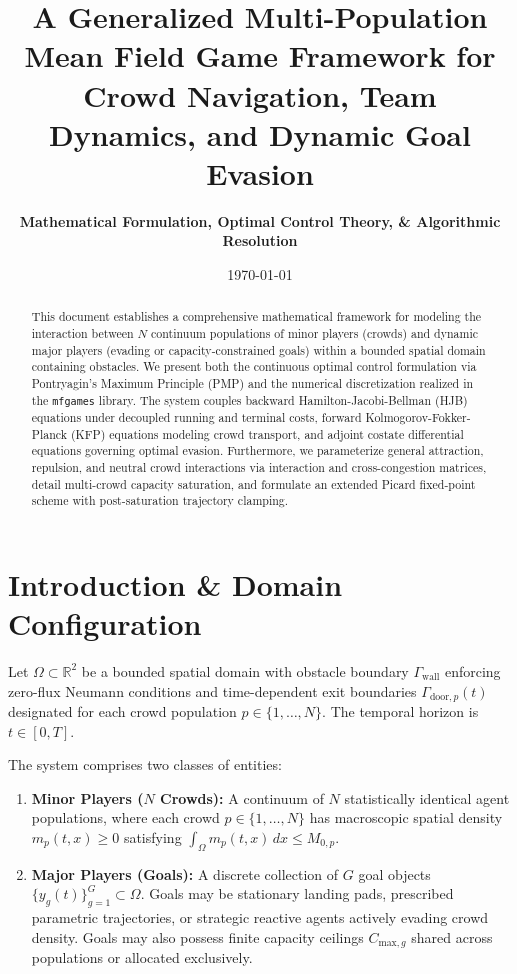\documentclass[11pt,a4paper]{article}
\title{\textbf{A Generalized Multi-Population Mean Field Game Framework for Crowd Navigation, Team Dynamics, and Dynamic Goal Evasion}}
\author{\textbf{Mathematical Formulation, Optimal Control Theory, \& Algorithmic Resolution}}
\date{\today}
\begin{document}
\maketitle

\begin{abstract}
This document establishes a comprehensive mathematical framework for modeling the interaction between $N$ continuum populations of minor players (crowds) and dynamic major players (evading or capacity-constrained goals) within a bounded spatial domain containing obstacles. We present both the continuous optimal control formulation via Pontryagin's Maximum Principle (PMP) and the numerical discretization realized in the \texttt{mfgames} library. The system couples backward Hamilton-Jacobi-Bellman (HJB) equations under decoupled running and terminal costs, forward Kolmogorov-Fokker-Planck (KFP) equations modeling crowd transport, and adjoint costate differential equations governing optimal evasion. Furthermore, we parameterize general attraction, repulsion, and neutral crowd interactions via interaction and cross-congestion matrices, detail multi-crowd capacity saturation, and formulate an extended Picard fixed-point scheme with post-saturation trajectory clamping.
\end{abstract}

\section{Introduction \& Domain Configuration}
Let $\Omega \subset \mathbb{R}^2$ be a bounded spatial domain with obstacle boundary $\Gamma_{\text{wall}}$ enforcing zero-flux Neumann conditions and time-dependent exit boundaries $\Gamma_{\text{door}, p}(t)$ designated for each crowd population $p \in \{1, \dots, N\}$. The temporal horizon is $t \in [0, T]$.

The system comprises two classes of entities:
\begin{enumerate}
    \item \textbf{Minor Players ($N$ Crowds):} A continuum of $N$ statistically identical agent populations, where each crowd $p \in \{1, \dots, N\}$ has macroscopic spatial density $m_p(t, x) \ge 0$ satisfying $\int_\Omega m_p(t, x) \, dx \le M_{0, p}$.
    \item \textbf{Major Players (Goals):} A discrete collection of $G$ goal objects $\{y_g(t)\}_{g=1}^G \subset \Omega$. Goals may be stationary landing pads, prescribed parametric trajectories, or strategic reactive agents actively evading crowd density. Goals may also possess finite capacity ceilings $C_{\text{max}, g}$ shared across populations or allocated exclusively.
\end{enumerate}
\end{document}
